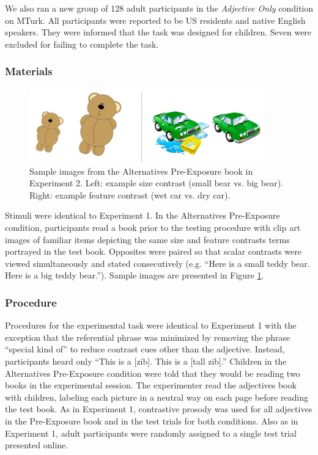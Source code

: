 \documentclass[man]{apa2}
\begin{document}
We also ran a new group of 128 adult participants in the \emph{Adjective Only} condition on MTurk.  All participants were reported to be US residents and native English speakers.  They were informed that the task was designed for children.  Seven were excluded for failing to complete the task. 

\subsubsection{Materials}

\begin{figure}[t] 
  \begin{center} 
    \includegraphics[width=4in]{figures/aliens_book_demo_mod.png} 
    \caption{\label{fig:book_demo} Sample images from the Alternatives Pre-Exposure book in Experiment 2. Left: example size contrast (small bear vs. big bear). Right: example feature contrast (wet car vs. dry car).}
  \end{center} 
\vspace{-10ex}
\end{figure}

Stimuli were identical to Experiment 1. In the Alternatives Pre-Exposure condition, participants read a book prior to the testing procedure with clip art images of familiar items depicting the same size and feature contrasts terms portrayed in the test book. Opposites were paired so that scalar contrasts were viewed simultaneously and stated consecutively (e.g. ``Here is a small teddy bear. Here is a big teddy bear.'').  Sample images are presented in Figure \ref{fig:book_demo}.


\subsubsection{Procedure}

Procedures for the experimental task were identical to Experiment 1 with the exception that the referential phrase was minimized by removing the phrase ``special kind of'' to reduce contrast cues other than the adjective.  Instead, participants heard only ``This is a [zib]. This is a [tall zib].''  Children in the Alternatives Pre-Exposure condition were told that they would be reading two books in the experimental session. The experimenter read the adjectives book with children, labeling each picture in a neutral way on each page before reading the test book. As in Experiment 1, contrastive prosody was used for all adjectives in the Pre-Exposure book and in the test trials for both conditions. Also as in Experiment 1, adult participants were randomly assigned to a single test trial presented online.  
\end{document}
